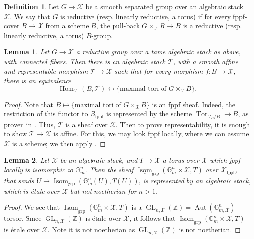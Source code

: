 \documentclass{amsart}
\newtheorem{lemma}[lemma]{Lemma}
\theoremstyle{definition}
\newtheorem{definition}[definition]{Definition}
\newcommand{\bG}{\mathbb{G}}
\newcommand{\bZ}{\mathbb{Z}}
\newcommand{\cX}{\mathcal{X}}
\newcommand{\cT}{\mathcal{T}}
\newcommand{\fppf}{\operatorname{fppf}}
\DeclareMathOperator{\Isom}{Isom}
\DeclareMathOperator{\GL}{GL}
\DeclareMathOperator{\Tor}{Tor}
\newcommand{\Gm}{\mathbb{G}_m}
\begin{document}
\begin{definition}
    Let $G\to \cX$ be a smooth separated group over an algebraic stack $\cX$. We say that $G$ is reductive (resp. linearly reductive, a torus) if for every fppf-cover $B\to \cX$ from a scheme $B$, the pull-back $G\times_\cX B\to B$ is a reductive (resp. linearly reductive, a torus) $B$-group. 
\end{definition}
\begin{lemma}\label{lemma_moduli_of_max_tori}
    Let $G\to \cX$ a reductive group over a tame algebraic stack as above, with connected fibers. Then there is an algebraic stack $\cT$, with a smooth affine and representable morphism $\cT\to \cX$ such that for every morphism $f:B\to \cX$, there is an equivalence 
    \[
\operatorname{Hom}_\cX(B,\cT) \longleftrightarrow \{\text{maximal tori of }G\times_\cX B\}.
    \]
\end{lemma}
\begin{proof}
    Note that $B\mapsto \{\text{maximal tori of }G\times_\cX B\}$ is an fppf sheaf. Indeed, the restriction of this functor to $B_{\fppf}$ is represented by the scheme $\Tor_{G_B/B}\to B$, as proven in \cite[Theorem 3.2.6]{ConradReductive}. Thus, $\cT$ is a sheaf over $\cX$. Then to prove representability, it is enough to show $\cT\to\cX$ is affine. For this, we may look fppf locally, where we can assume $\cX$ is a scheme; we then apply \cite[XII, 5.4]{SGA3}.%
\end{proof}


\begin{lemma}\label{lemma_trivializing_the_torus_is_etale}
    Let $\cX$ be an algebraic stack, and 
    $T\to \cX$ a torus over $\cX$ which fppf-locally
    is isomorphic to
    $\Gm^n$. Then the sheaf
    $\underline{\Isom}_{\operatorname{grp}}(\Gm^n\times \cX,T)$ over $\cX_{\fppf}$, that sends $U\to \Isom_{\operatorname{grp}}(\Gm^n(U),T(U))$, is represented by an algebraic stack, which is \'etale over $\cX$ but not noetherian for $n>1$.
\end{lemma}
\begin{proof}
    We see that $\underline{\Isom}_{\operatorname{grp}}(\Gm^n\times \cX,T)$ is a $\GL_{n,\cX}(\bZ)=\operatorname{Aut}(\bG_{m,\cX}^n)$-torsor. Since $\GL_{n,\cX}(\bZ)$ is \'etale over $\cX$, it follows that $\underline{\Isom}_{\operatorname{grp}}(\Gm^n\times \cX,T)$ is \'etale over $\cX$. Note it is not noetherian as $\GL_{n,\cX}(\bZ)$ is not noetherian.
\end{proof}
\end{document}

